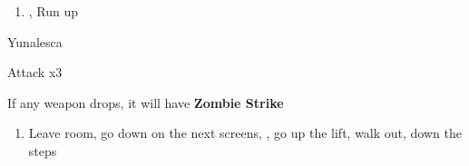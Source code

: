 \begin{enumerate}[resume]
    \item \save, Run up
\end{enumerate}
\begin{battle}[132000]{Yunalesca}
    \begin{itemize}
        \summon{\bahamut}
        \bahamutf Attack x3
    \end{itemize}
    If any weapon drops, it will have \textbf{Zombie Strike}
\end{battle}
\begin{enumerate}[resume]
    \item Leave room, go down on the next screens, \save, go up the lift, walk out, down the steps
\end{enumerate}
